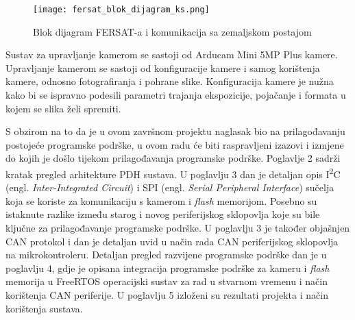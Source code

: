 \begin{figure}[H]
	\centering
	\texttt{[image: fersat\_blok\_dijagram\_ks.png]}
	\caption{Blok dijagram FERSAT-a i komunikacija sa zemaljskom postajom \cite{diplomski_goran_petrak}}
	\label{fig:fersat_blok_ks}
\end{figure}

Sustav za upravljanje kamerom se sastoji od Arducam Mini 5MP Plus kamere. Upravljanje kamerom se sastoji od konfiguracije kamere i samog korištenja kamere, odnosno fotografiranja i pohrane slike. Konfiguracija kamere je nužna kako bi se ispravno podesili parametri trajanja ekspozicije, pojačanje i formata u kojem se slika želi spremiti.

S obzirom na to da je u ovom završnom projektu naglasak bio na prilagođavanju postojeće programske podrške, u ovom radu će biti raspravljeni izazovi i izmjene do kojih je došlo tijekom prilagođavanja programske podrške. Poglavlje 2 sadrži kratak pregled arhitekture PDH sustava. U poglavlju 3 dan je detaljan opis I\textsuperscript{2}C (engl. \textit{Inter-Integrated Circuit}) i SPI (engl. \textit{Serial Peripheral Interface}) sučelja koja se koriste za komunikaciju s kamerom i \textit{flash} memorijom. Posebno su istaknute razlike između starog i novog periferijskog sklopovlja koje su bile ključne za prilagođavanje programske podrške. U poglavlju 3 je također objašnjen CAN protokol i dan je detaljan uvid u način rada CAN periferijskog sklopovlja na mikrokontroleru. Detaljan pregled razvijene programske podrške dan je u poglavlju 4, gdje je opisana integracija programske podrške za kameru i \textit{flash} memorija u FreeRTOS operacijski sustav za rad u stvarnom vremenu i način korištenja CAN periferije. U poglavlju 5 izloženi su rezultati projekta i način korištenja sustava.